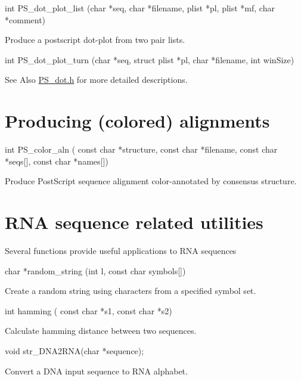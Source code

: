 \begin{DoxyVerb}int PS_dot_plot_list (char *seq,
                      char *filename,
                      plist *pl,
                      plist *mf,
                      char *comment)
\end{DoxyVerb}
 Produce a postscript dot-\/plot from two pair lists.

\begin{DoxyVerb}int PS_dot_plot_turn (char *seq,
                      struct plist *pl,
                      char *filename,
                      int winSize)
\end{DoxyVerb}


\begin{DoxySeeAlso}{See Also}
\hyperlink{PS__dot_8h}{P\-S\-\_\-dot.\-h} for more detailed descriptions.
\end{DoxySeeAlso}
\hypertarget{mp_utils_utils_aln}{}\section{Producing (colored) alignments}\label{mp_utils_utils_aln}
\begin{DoxyVerb}int PS_color_aln (
            const char *structure,
            const char *filename,
            const char *seqs[],
            const char *names[])
\end{DoxyVerb}
 Produce Post\-Script sequence alignment color-\/annotated by consensus structure.

\hypertarget{mp_utils_utils_seq}{}\section{R\-N\-A sequence related utilities}\label{mp_utils_utils_seq}
Several functions provide useful applications to R\-N\-A sequences

\begin{DoxyVerb}char  *random_string (int l,
                      const char symbols[])
\end{DoxyVerb}
 Create a random string using characters from a specified symbol set.

\begin{DoxyVerb}int   hamming ( const char *s1,
                const char *s2)
\end{DoxyVerb}
 Calculate hamming distance between two sequences.

\begin{DoxyVerb}void str_DNA2RNA(char *sequence);
\end{DoxyVerb}
 Convert a D\-N\-A input sequence to R\-N\-A alphabet.

